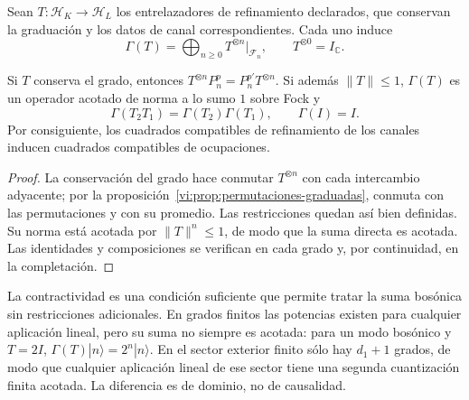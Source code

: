 Sean \(T:\mathcal H_K\to\mathcal H_L\) los entrelazadores
de refinamiento declarados, que conservan la graduación y los
datos de canal correspondientes. Cada uno induce
\begin{equation}
 \Gamma(T)=\bigoplus_{n\ge0}T^{\otimes n}|_{\mathcal F_n},
 \qquad T^{\otimes0}=I_{\mathbb C}.
 \label{vi:eq:segunda-cuantizacion-transporte}
\end{equation}

\begin{theorem}
\label{vi:thm:fock-naturalidad}
Si \(T\) conserva el grado, entonces
\(T^{\otimes n}P_n^p=P_n^{p'}T^{\otimes n}\).
Si además \(\|T\|\le1\), \(\Gamma(T)\) es un operador
acotado de norma a lo sumo \(1\) sobre Fock y
\[
 \Gamma(T_2T_1)=\Gamma(T_2)\Gamma(T_1),\qquad
 \Gamma(I)=I.
\]
Por consiguiente, los cuadrados compatibles de refinamiento
de los canales inducen cuadrados compatibles de ocupaciones.
\end{theorem}
\begin{proof}
La conservación del grado hace conmutar \(T^{\otimes n}\)
con cada intercambio adyacente; por la
proposición~\ref{vi:prop:permutaciones-graduadas}, conmuta
con las permutaciones y con su promedio. Las restricciones
quedan así bien definidas. Su norma está acotada por
\(\|T\|^n\le1\), de modo que la suma directa es acotada.
Las identidades y composiciones se verifican en cada grado
y, por continuidad, en la completación.
\end{proof}

La contractividad es una condición suficiente que permite tratar
la suma bosónica sin restricciones adicionales. En grados finitos
las potencias existen para cualquier aplicación lineal, pero su
suma no siempre es acotada: para un modo bosónico y \(T=2I\),
\(\Gamma(T)|n\rangle=2^n|n\rangle\). En el sector exterior
finito sólo hay \(d_1+1\) grados, de modo que cualquier
aplicación lineal de ese sector tiene una segunda cuantización
finita acotada. La diferencia es de dominio, no de causalidad.


